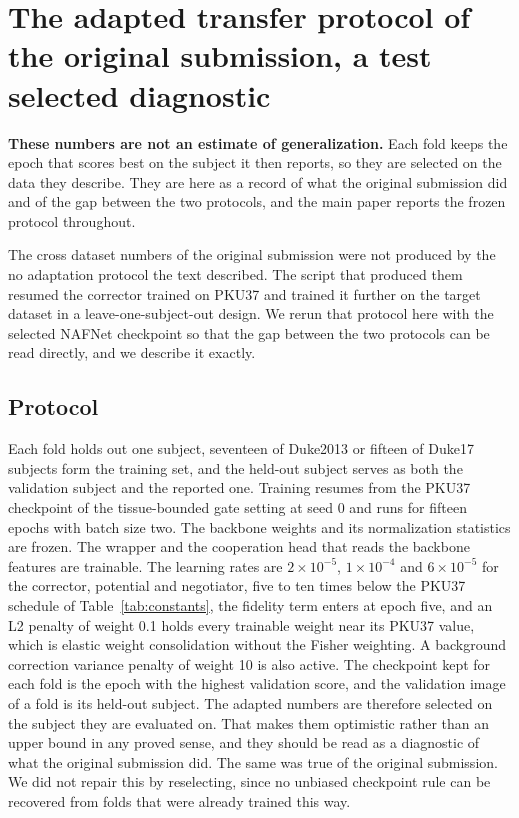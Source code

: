 \section{The adapted transfer protocol of the original submission, a test selected diagnostic}
\label{sec:supp_adapted}

\noindent\textbf{These numbers are not an estimate of generalization.} Each fold keeps the epoch that
scores best on the subject it then reports, so they are selected on the data they describe. They are
here as a record of what the original submission did and of the gap between the two protocols, and
the main paper reports the frozen protocol throughout.

The cross dataset numbers of the original submission were not produced by the no adaptation
protocol the text described. The script that produced them resumed the corrector trained on PKU37
and trained it further on the target dataset in a leave-one-subject-out design. We rerun that
protocol here with the selected NAFNet checkpoint so that the gap between the two protocols can be
read directly, and we describe it exactly.

\subsection{Protocol}
Each fold holds out one subject, seventeen of Duke2013 or fifteen of Duke17 subjects form the
training set, and the held-out subject serves as both the validation subject and the reported one. Training resumes
from the PKU37 checkpoint
of the tissue-bounded gate setting at seed 0 and runs for fifteen epochs with batch size two. The
backbone weights and its normalization statistics are frozen. The wrapper and the cooperation head
that reads the backbone features are trainable. The learning rates are $2{\times}10^{-5}$,
$1{\times}10^{-4}$ and $6{\times}10^{-5}$ for the corrector, potential and negotiator, five to ten
times below the PKU37 schedule of Table~\ref{tab:constants}, the fidelity term enters at epoch five,
and an L2 penalty of weight 0.1 holds every trainable weight near its PKU37 value, which is elastic
weight consolidation without the Fisher weighting. A background correction variance penalty of
weight 10 is also active. The checkpoint kept for each fold is the epoch with the highest validation
score, and the validation image of a fold is its held-out subject. The adapted numbers are therefore
selected on the subject they are evaluated on. That makes them optimistic rather than an upper bound
in any proved sense, and they should be read as a diagnostic of what the original submission did. The same was true of the original submission. We did not repair this by reselecting, since
no unbiased checkpoint rule can be recovered from folds that were already trained this way.

